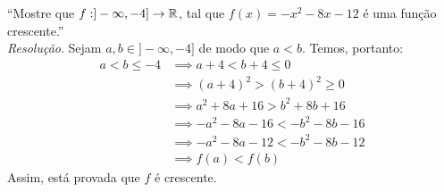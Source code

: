 \enquote{Mostre que $f: ]-\infty, -4] \rightarrow \mathbb R$, tal que $f(x) = -x^2 -8x - 12$ é uma função crescente.} \\
\emph{Resolução}. Sejam $a, b \in ]-\infty, -4]$ de modo que $a < b$. Temos, portanto:
\begin{align*}
    a < b \le -4 & \implies a + 4 < b + 4 \le 0 \\ & \implies
    (a + 4)^2 > (b + 4)^2 \ge 0 \\ & \implies
    a^2 + 8a + 16 > b^2 + 8b + 16 \\ & \implies
    -a^2 - 8a - 16 < -b^2 - 8b - 16 \\ & \implies
    -a^2 - 8a - 12 < -b^2 - 8b - 12 \\ & \implies
    f(a) < f(b)
\end{align*}
Assim, está provada que $f$ é crescente.